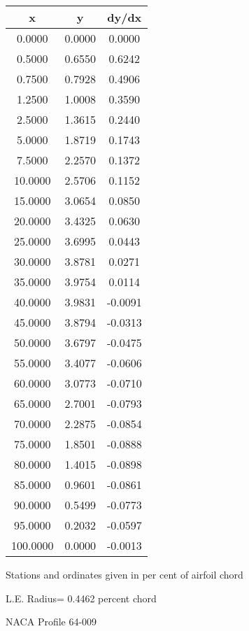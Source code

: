 \documentclass[11pt]{book}
\begin{document}
 \vspace{8mm}
 \begin{tabular}{|c|c|c|} \hline 
  x  &  y  &  dy/dx \\
 \hline
0.0000 & 0.0000 & 0.0000 \\
0.5000 & 0.6550 & 0.6242 \\
0.7500 & 0.7928 & 0.4906 \\
1.2500 & 1.0008 & 0.3590 \\
2.5000 & 1.3615 & 0.2440 \\
5.0000 & 1.8719 & 0.1743 \\
7.5000 & 2.2570 & 0.1372 \\
10.0000 & 2.5706 & 0.1152 \\
15.0000 & 3.0654 & 0.0850 \\
20.0000 & 3.4325 & 0.0630 \\
25.0000 & 3.6995 & 0.0443 \\
30.0000 & 3.8781 & 0.0271 \\
35.0000 & 3.9754 & 0.0114 \\
40.0000 & 3.9831 & -0.0091 \\
45.0000 & 3.8794 & -0.0313 \\
50.0000 & 3.6797 & -0.0475 \\
55.0000 & 3.4077 & -0.0606 \\
60.0000 & 3.0773 & -0.0710 \\
65.0000 & 2.7001 & -0.0793 \\
70.0000 & 2.2875 & -0.0854 \\
75.0000 & 1.8501 & -0.0888 \\
80.0000 & 1.4015 & -0.0898 \\
85.0000 & 0.9601 & -0.0861 \\
90.0000 & 0.5499 & -0.0773 \\
95.0000 & 0.2032 & -0.0597 \\
100.0000 & 0.0000 & -0.0013 \\
 \hline
 \end{tabular}
 \vspace{8mm}


Stations and ordinates given in per cent of airfoil chord 


L.E. Radius=  0.4462 percent chord
 \newpage
  \label{p64-009}
 \begin{Large}
 NACA Profile 64-009
 \end{Large}
  
\end{document}
